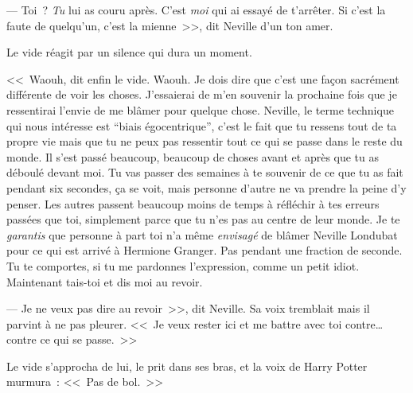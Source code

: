 --- Toi~? \emph{Tu} lui as couru après. C'est \emph{moi} qui ai essayé de t'arrêter. Si c'est la faute de quelqu'un, c'est la mienne~>>, dit Neville d'un ton amer.

Le vide réagit par un silence qui dura un moment.

<<~Waouh, dit enfin le vide. Waouh. Je dois dire que c'est une façon sacrément différente de voir les choses. J'essaierai de m'en souvenir la prochaine fois que je ressentirai l'envie de me blâmer pour quelque chose. Neville, le terme technique qui nous intéresse est “biais égocentrique”, c'est le fait que tu ressens tout de ta propre vie mais que tu ne peux pas ressentir tout ce qui se passe dans le reste du monde. Il s'est passé beaucoup, beaucoup de choses avant et après que tu as déboulé devant moi. Tu vas passer des semaines à te souvenir de ce que tu as fait pendant six secondes, ça se voit, mais personne d'autre ne va prendre la peine d'y penser. Les autres passent beaucoup moins de temps à réfléchir à tes erreurs passées que toi, simplement parce que tu n'es pas au centre de leur monde. Je te \emph{garantis} que personne à part toi n'a même \emph{envisagé} de blâmer Neville Londubat pour ce qui est arrivé à Hermione Granger. Pas pendant une fraction de seconde. Tu te comportes, si tu me pardonnes l'expression, comme un petit idiot. Maintenant tais-toi et dis moi au revoir.

--- Je ne veux pas dire au revoir~>>, dit Neville. Sa voix tremblait mais il parvint à ne pas pleurer. <<~Je veux rester ici et me battre avec toi contre… contre ce qui se passe.~>>

Le vide s'approcha de lui, le prit dans ses bras, et la voix de Harry Potter murmura~: <<~Pas de bol.~>>

